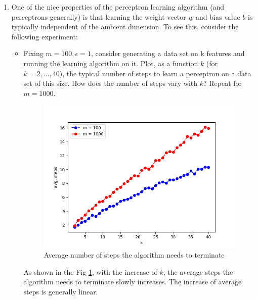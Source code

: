 \documentclass[letter, 12pt]{article}
\begin{document}
\begin{enumerate}
        
        \item {One of the nice properties of the perceptron learning algorithm (and perceptrons generally) is that learning
            the weight vector $ \underline{w} $ and bias value $ b $ is typically independent of the ambient dimension. To see this, consider
            the following experiment:}
        \begin{itemize}
            \item {Fixing $ m = 100, \epsilon = 1 $, consider generating a data set on k features and running the learning algorithm on
                it. Plot, as a function $ k $ (for $ k = 2, \dots , 40 $), the typical number of steps to learn a perceptron on a data
                set of this size. How does the number of steps vary with $ k $? Repeat for $ m = 1000 $.}
            \begin{figure}[H]
	            \centering
	            \includegraphics[width=.7\textwidth]{q4-2.png}
	            \caption{Average number of steps the algorithm needs to terminate}
	            \label{q4}
        	\end{figure}
        	\par{As shown in the Fig \ref{q4}, with the increase of $ k $, the average steps the algorithm needs to terminate slowly increases. The increase of average steps is generally linear.}
        \end{itemize}
        

\end{enumerate}
\end{document}

